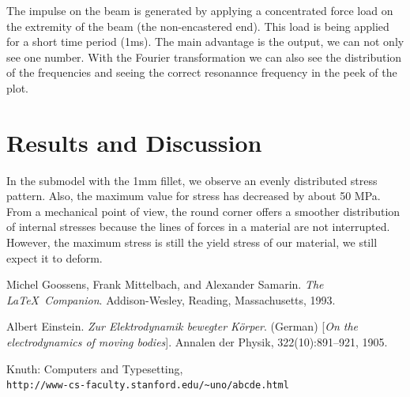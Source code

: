\documentclass[12pt]{article}
\begin{document}
\noindent The impulse on the beam is generated by applying a concentrated force load on the extremity of the beam (the non-encastered end).
This load is being applied for a short time period (1ms). The main advantage is the output, we can not only see one number. With the
Fourier transformation we can also see the distribution of the frequencies and seeing the correct resonannce frequency in the peek of the plot.



\pagebreak
\section{Results and Discussion}

In the submodel with the 1mm fillet, we observe an evenly distributed stress pattern. Also,
the maximum value for stress has decreased by about 50 MPa. From a mechanical point of view, 
the round corner offers a smoother distribution of internal stresses because the lines of 
forces in a material are not interrupted. However, the maximum stress is still the yield 
stress of our material, we still expect it to deform.

\pagebreak
\begin{thebibliography}{9}

  

  Michel Goossens, Frank Mittelbach, and Alexander Samarin. 
  \textit{The \LaTeX\ Companion}. 
  Addison-Wesley, Reading, Massachusetts, 1993.
   
  Albert Einstein. 
  \textit{Zur Elektrodynamik bewegter K{\"o}rper}. (German) 
  [\textit{On the electrodynamics of moving bodies}]. 
  Annalen der Physik, 322(10):891–921, 1905.
   
  Knuth: Computers and Typesetting,
  \\\texttt{http://www-cs-faculty.stanford.edu/\~{}uno/abcde.html}
\end{thebibliography}
\end{document}
